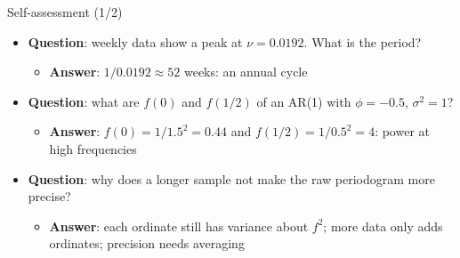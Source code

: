 \begin{frame}{Self-assessment (1/2)}
\itemsize{\footnotesize}
\begin{itemize}
    \item \textbf{Question}: weekly data show a peak at $\nu = 0.0192$. What is the period?
    \begin{itemize}
        \item \textbf{Answer}: $1/0.0192 \approx 52$ weeks: an annual cycle
    \end{itemize}
    \item \textbf{Question}: what are $f(0)$ and $f(1/2)$ of an AR(1) with $\phi = -0.5$, $\sigma^2 = 1$?
    \begin{itemize}
        \item \textbf{Answer}: $f(0) = 1/1.5^2 = 0.44$ and $f(1/2) = 1/0.5^2 = 4$: power at high frequencies
    \end{itemize}
    \item \textbf{Question}: why does a longer sample not make the raw periodogram more precise?
    \begin{itemize}
        \item \textbf{Answer}: each ordinate still has variance about $f^2$; more data only adds ordinates; precision needs averaging
    \end{itemize}
\end{itemize}
\end{frame}

